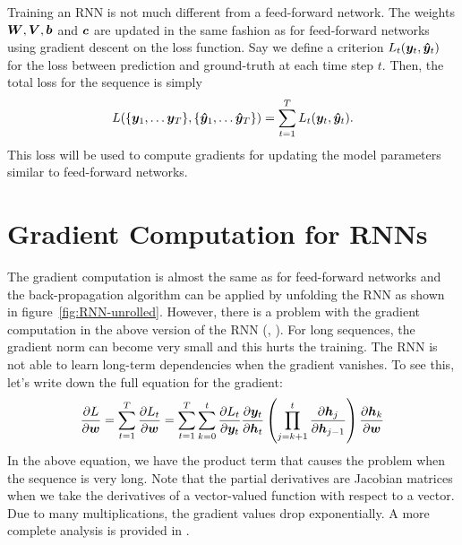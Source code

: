 		Training an RNN is not much different from a feed-forward network.
		The weights $\bm{W}, \bm{V}, \bm{b}$ and $\bm{c}$ are updated in the same fashion as for feed-forward networks using gradient descent on the loss function.
		Say we define a criterion $L_t(\bm{y}_t, \bm{\hat{y}}_t)$ for the loss between prediction and ground-truth at each time step $t$.
		Then, the total loss for the sequence is simply 
		\begin{equation}\label{eq:loss_for_rnn}
			L(\{\vectr{y}_1, \dots \vectr{y}_T\}, \{\vectr{\hat{y}}_1, \dots \vectr{\hat{y}}_T\}) = \sum_{t=1}^{T} L_t(\vectr{y}_t, \vectr{\hat{y}}_t).
		\end{equation}
		This loss will be used to compute gradients for updating the model parameters similar to feed-forward networks.
		
	\section{Gradient Computation for RNNs}
		
		The gradient computation is almost the same as for feed-forward networks and the back-propagation algorithm can be applied by unfolding the RNN as shown in figure~\ref{fig:RNN-unrolled}.
		However, there is a problem with the gradient computation in the above version of the RNN (\cite{pascanu2013difficulty}, \cite{bengio1994learning}).
		For long sequences, the gradient norm can become very small and this hurts the training.
		The RNN is not able to learn long-term dependencies when the gradient vanishes.
		To see this, let's write down the full equation for the gradient:
		\begin{equation}
			\frac{\partial L}{\partial \bm{w}}
			= \sum_{t=1}^{T} 
				\frac{\partial L_t}{\partial \bm{w}}
			= \sum_{t=1}^{T} 
				\sum_{k=0}^{t} 
					\frac{\partial L_t}{\partial \bm{y}_t}
					\frac{\partial \bm{y}_t}{\partial \bm{h}_t}
					\left(
						\prod_{j=k+1}^{t} \frac{\partial \bm{h}_j}{\partial \bm{h}_{j-1}}
					\right)
					\frac{\partial \bm{h}_{k}}{\partial \bm{w}}
		\end{equation}
		In the above equation, we have the product term that causes the problem when the sequence is very long.
		Note that the partial derivatives are Jacobian matrices when we take the derivatives of a vector-valued function with respect to a vector.
		Due to many multiplications, the gradient values drop exponentially.
		A more complete analysis is provided in \cite{pascanu2013difficulty}.
		
